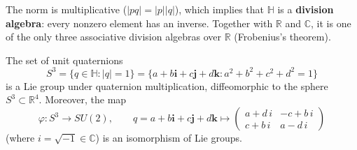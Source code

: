 The norm is multiplicative ($|pq| = |p||q|$), which implies that $\mathbb{H}$ is a \textbf{division algebra}: every nonzero element has an inverse. Together with $\mathbb{R}$ and $\mathbb{C}$, it is one of the only three associative division algebras over $\mathbb{R}$ (Frobenius's theorem).

\begin{proposition}\label{prop:cuaterniones_su2}
The set of unit quaternions
\[
S^3 = \{q \in \mathbb{H} : |q| = 1\} = \{a + b\mathbf{i} + c\mathbf{j} + d\mathbf{k} : a^2 + b^2 + c^2 + d^2 = 1\}
\]
is a Lie group under quaternion multiplication, diffeomorphic to the sphere $S^3 \subset \mathbb{R}^4$. Moreover, the map
\begin{equation}\label{eq:iso_cuaterniones_su2}
\varphi: S^3 \longrightarrow SU(2), \qquad q = a + b\mathbf{i} + c\mathbf{j} + d\mathbf{k} \longmapsto \begin{pmatrix} a + d\,i & -c + b\,i \\ c + b\,i & a - d\,i \end{pmatrix}
\end{equation}
(where $i = \sqrt{-1} \in \mathbb{C}$) is an isomorphism of Lie groups.
\end{proposition}

